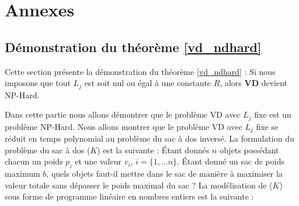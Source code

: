 	
	
\section{Annexes}
\subsection{Démonstration du théorème \ref{vd_ndhard}}
\label{vd_ndhard_section}
Cette section présente la démonstration du théorème \ref{vd_ndhard} : Si nous imposons que tout $L_j$ est soit nul ou égal à une constante $R$, alors \textbf{VD} devient NP-Hard.



Dans cette partie nous allons démontrer que le problème VD avec $L_j$ fixe est un problème NP-Hard.
Nous allons montrer que le problème VD avec $L_j$ fixe se réduit en temps polynomial au problème du sac à dos inversé.
La formulation du problème du sac à dos ($K$) est la suivante :
\og Étant  donnés  $n$  objets  possédant chacun  un  poids $p_i$ et une  valeur $v_i$, $i=\{1, \dots n\}$. Étant  donné un sac de poids  maximum $b$,  quels  objets faut-il  mettre  dans  le  sac  de  manière  à  maximiser  la  valeur  totale  sans  dépasser  le  poids maximal du sac ? \fg{}  La modélisation de ($K$) sous forme de programme linéaire en nombres entiers est la suivante :


